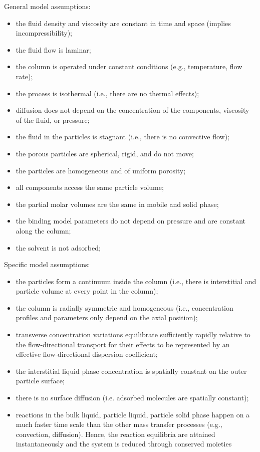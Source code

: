 \documentclass{article}
\begin{document}
General model assumptions:
\begin{itemize}
    \item the fluid density and viscosity are constant in time and space (implies incompressibility);
    \item the fluid flow is laminar;
    \item the column is operated under constant conditions (e.g., temperature, flow rate);
    \item the process is isothermal (i.e., there are no thermal effects);
    \item diffusion does not depend on the concentration of the components, viscosity of the fluid, or pressure;
    \item the fluid in the particles is stagnant (i.e., there is no convective flow);
    \item the porous particles are spherical, rigid, and do not move;
    \item the particles are homogeneous and of uniform porosity;
    \item all components access the same particle volume;
    \item the partial molar volumes are the same in mobile and solid phase;
    \item the binding model parameters do not depend on pressure and are constant along the column;
    \item the solvent is not adsorbed;
\end{itemize}

Specific model assumptions:
\begin{itemize}
    \item the particles form a continuum inside the column (i.e., there is interstitial and particle volume at every point in the column);
    \item the column is radially symmetric and homogeneous (i.e., concentration profiles and parameters only depend on the axial position);
    \item transverse concentration variations equilibrate sufficiently rapidly relative to the flow-directional transport for their effects to be represented by an effective flow-directional dispersion coefficient;
    \item the interstitial liquid phase concentration is spatially constant on the outer particle surface;
    \item there is no surface diffusion (i.e. adsorbed molecules are spatially constant);
    \item reactions in the bulk liquid, particle liquid, particle solid phase happen on a much faster time scale than the other mass transfer processes (e.g., convection, diffusion). Hence, the reaction equilibria are attained instantaneously and the system is reduced through conserved moieties
\end{itemize}
\end{document}
